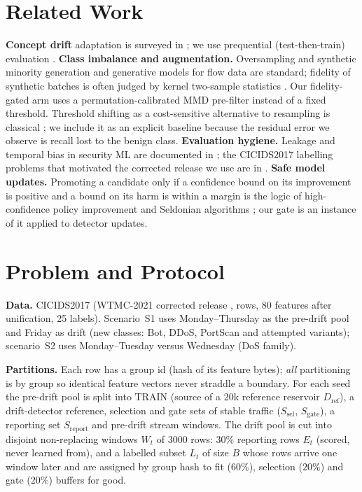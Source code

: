 \documentclass[conference]{IEEEtran}
\begin{document}
\section{Related Work}
\textbf{Concept drift} adaptation is surveyed in \cite{gama2014}; we use prequential (test-then-train) evaluation \cite{gama2013}.
\textbf{Class imbalance and augmentation.} Oversampling and synthetic minority generation \cite{chawla2002smote,he2009} and
generative models for flow data \cite{ring2019,gulrajani2017} are standard; fidelity of synthetic batches is often judged by
kernel two-sample statistics \cite{gretton2012}. Our fidelity-gated arm uses a permutation-calibrated MMD pre-filter instead of a
fixed threshold. Threshold shifting as a cost-sensitive alternative to resampling is classical \cite{elkan2001}; we include it as
an explicit baseline because the residual error we observe is recall lost to the benign class.
\textbf{Evaluation hygiene.} Leakage and temporal bias in security ML are documented in \cite{arp2022,pendlebury2019}; the
CICIDS2017 labelling problems that motivated the corrected release we use are in \cite{engelen2021,sharafaldin2018}.
\textbf{Safe model updates.} Promoting a candidate only if a confidence bound on its improvement is positive and a bound on
its harm is within a margin is the logic of high-confidence policy improvement and Seldonian algorithms
\cite{thomas2015,thomas2019}; our gate is an instance of it applied to detector updates.

\section{Problem and Protocol}\label{sec:protocol}
\textbf{Data.} CICIDS2017 (WTMC-2021 corrected release \cite{engelen2021}, \nRows{} rows, 80 features after unification,
25 labels). Scenario~S1 uses Monday--Thursday as the pre-drift pool and Friday as drift (new classes: Bot, DDoS, PortScan and
attempted variants); scenario~S2 uses Monday--Tuesday versus Wednesday (DoS family).

\textbf{Partitions.} Each row has a group id (hash of its feature bytes); \emph{all} partitioning is by group so identical feature
vectors never straddle a boundary. For each seed the pre-drift pool is split into $\mathrm{TRAIN}$ (source of a 20k reference
reservoir $D_{\mathrm{ref}}$), a drift-detector reference, selection and gate sets of stable traffic ($S_{\mathrm{sel}}$, $S_{\mathrm{gate}}$), a reporting set
$S_{\mathrm{report}}$ and pre-drift stream windows. The drift pool is cut into disjoint non-replacing windows $W_t$ of 3000 rows: 30\% reporting rows
$E_t$ (scored, never learned from), and a labelled subset $L_t$ of size $B$ whose rows arrive one window later and are assigned by
group hash to fit ($60\%$), selection ($20\%$) and gate ($20\%$) buffers for good.
\end{document}
